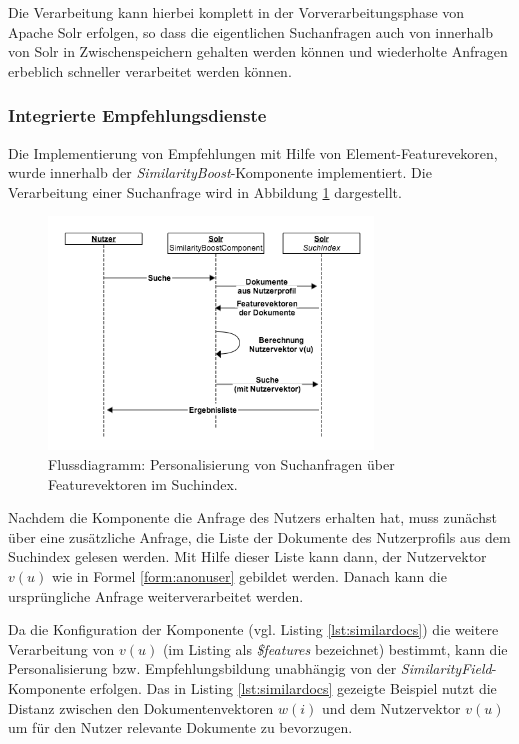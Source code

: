 Die Verarbeitung kann hierbei komplett in der Vorverarbeitungsphase von Apache Solr erfolgen, so dass die eigentlichen Suchanfragen auch von innerhalb von Solr in Zwischenspeichern gehalten werden können und wiederholte Anfragen erbeblich schneller verarbeitet werden können.

\subsubsection{Integrierte Empfehlungsdienste} \label{sec:implmodelcalc}

Die Implementierung von Empfehlungen mit Hilfe von Element-Featurevekoren, wurde innerhalb der \textit{SimilarityBoost}-Komponente implementiert.  Die Verarbeitung einer Suchanfrage wird in Abbildung  \ref{fig:seq-intern-recommender} dargestellt.

\begin{figure}[H]
  \centering
    \includegraphics[width=0.77\textwidth]{Abbildungen/search-rec2.png}
    \caption[Flussdiagram - interne Empfehlungsbildung]{\footnotesize Flussdiagramm: Personalisierung von Suchanfragen über Featurevektoren im Suchindex.}
    \label{fig:seq-intern-recommender}
\end{figure}

Nachdem die Komponente die Anfrage des Nutzers erhalten hat, muss zunächst über eine zusätzliche Anfrage, die Liste der Dokumente des Nutzerprofils aus dem Suchindex gelesen werden. Mit Hilfe dieser Liste kann dann, der Nutzervektor $v(u)$ wie in Formel \ref{form:anonuser} gebildet werden. Danach kann die ursprüngliche Anfrage weiterverarbeitet werden.

Da die Konfiguration der Komponente (vgl. Listing \ref{lst:similardocs}) die weitere Verarbeitung von $v(u)$ (im Listing als \textit{\$features} bezeichnet) bestimmt, kann die Personalisierung bzw. Empfehlungsbildung unabhängig von der \textit{SimilarityField}-Komponente erfolgen. Das in Listing \ref{lst:similardocs} gezeigte Beispiel nutzt die Distanz zwischen den Dokumentenvektoren $w(i)$ und dem Nutzervektor $v(u)$ um für den Nutzer relevante Dokumente zu bevorzugen.

